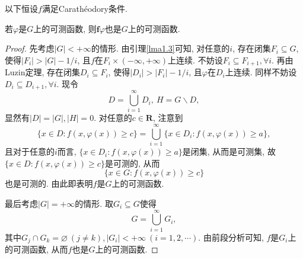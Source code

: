 以下恒设$f$满足Carath\'eodory条件.

\begin{lemma}
    若$\varphi$是$G$上的可测函数, 则$\bm{f}\varphi$也是$G$上的可测函数.
    \begin{proof}
        先考虑$|G| < +\infty$的情形. 由引理\ref{lma1.3}可知, 对任意的$i$, 存在闭集$F_i \subseteq G$, 使得$|F_i| > |G| - 1/i$, 且$f$在$F_i \times (-\infty, +\infty)$上连续. 不妨设$F_i \subseteq F_{i + 1}, \forall i$. 再由Luzin定理, 存在闭集$D_i \subseteq F_i$, 使得$|D_i| > |F_i| - 1/i$, 且$\varphi$在$D_i$上连续. 同样不妨设$D_i \subseteq D_{i + 1}, \forall i$. 现令
        \begin{equation*}
            D = \bigcup_{i = 1}^{\infty}D_i, \ H = G \smallsetminus D,
        \end{equation*}
        显然有$|D| = |G|, |H| = 0$. 对任意的$c \in \mathbf{R}$, 注意到 
        \begin{equation*}
            \{x \in D\colon f(x, \varphi(x)) \geq c\} = \bigcup_{i = 1}^{\infty}\{x \in D_i\colon f(x, \varphi(x)) \geq a\},
        \end{equation*}
        且对于任意的$i$而言, $\{x \in D_i\colon f(x, \varphi(x)) \geq a\}$是闭集, 从而是可测集, 故$\{x \in D\colon f(x, \varphi(x)) \geq c\}$是可测的, 从而 
        \begin{equation*}
            \{x \in G\colon f(x, \varphi(x)) \geq c\}
        \end{equation*}
        也是可测的. 由此即表明$f$是$G$上的可测函数.

        最后考虑$|G| = +\infty$的情形. 取$G_i \subseteq G$使得
        \begin{equation*}
            G = \bigcup_{i = 1}^{\infty}G_i,
        \end{equation*}
        其中$G_j \cap G_k = \varnothing\ (j \neq k), |G_i| < +\infty\ (i = 1, 2, \cdots)$. 由前段分析可知, $f$是$G_i$上的可测函数, 从而$f$也是$G$上的可测函数.
    \end{proof}
\end{lemma}

